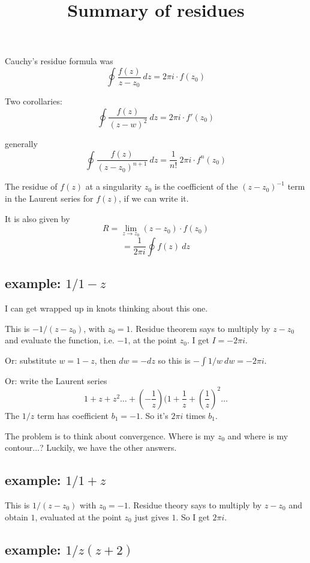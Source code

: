 \documentclass[11pt, oneside]{article}
\title{Summary of residues}
\date{}
\begin{document}
\maketitle
\Large


Cauchy's residue formula was
\[ \oint \frac{f(z)}{z - z_0} \ dz = 2 \pi i \cdot f(z_0) \]

Two corollaries:
\[ \oint \frac{f(z)}{(z - w)^2} \ dz = 2 \pi i \cdot f'(z_0) \]

generally
\[ \oint \frac{f(z)}{(z - z_0)^{n+1}} \ dz = \frac{1}{n!} \ 2 \pi i \cdot f^{n}(z_0) \]

The residue of $f(z)$ at a singularity $z_0$ is the coefficient of the $(z - z_0)^{-1}$ term in the Laurent series for $f(z)$, if we can write it.

It is also given by
\[ R = \lim_{z \rightarrow z_0} (z - z_0) \cdot f(z_0) \]
\[ = \frac{1}{2 \pi i} \oint f(z) \ dz \]

\subsection*{example:  $1/1-z$}

I can get wrapped up in knots thinking about this one.

This is $-1/(z-z_0)$, with $z_0 = 1$.  Residue theorem says to multiply by $z - z_0$ and evaluate the function, i.e. $-1$, at the point $z_0$.  I get $I = -2 \pi i$.

Or:  substitute $w = 1-z$, then $dw = -dz$ so this is $- \int 1/w \ dw = -2 \pi i$.  

Or:  write the Laurent series
\[ 1 + z + z^2 \dots + (-\frac{1}{z})(1 + \frac{1}{z} + ( \frac{1}{z})^2 \dots \]
The $1/z$ term has coefficient $b_1 = -1$.  So it's $2 \pi i$ times $b_1$.

The problem is to think about convergence.  Where is my $z_0$ and where is my contour...?  Luckily, we have the other answers.

\subsection*{example:  $1/1+z$}

This is $1/(z - z_0)$ with $z_0 = -1$.  Residue theory says to multiply by $z - z_0$ and obtain $1$, evaluated at the point $z_0$ just gives $1$.  So I  get $2 \pi i$.

\subsection*{example:  $1/z(z+2)$}
\end{document}
